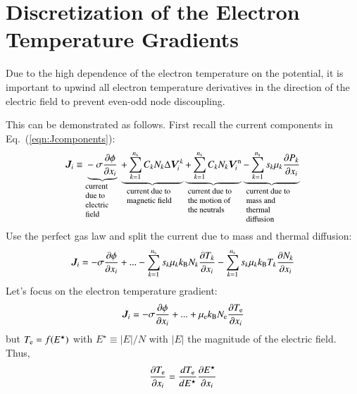 \documentclass{warpdoc}
\newcommand{\ns}{{n_{\rm s}}}
\renewcommand{\vec}[1]{\bm{#1}}
\begin{document}
\section{Discretization of the Electron Temperature Gradients}

 Due to the high dependence of the electron temperature on the potential, it is important to upwind all electron temperature derivatives in the direction of the electric field to prevent even-odd node discoupling. 

This can be demonstrated as follows. First recall the current components in Eq.\ (\ref{eqn:Jcomponents}):
%
\begin{equation}
 \vec{J}_i \equiv 
  \underbrace{-~\sigma\frac{\partial \phi}{\partial x_i}}_{\begin{minipage}{0.1\textwidth}\footnotesize\flushleft current due to electric field \end{minipage}}
\underbrace{+ \sum_{k=1}^\ns C_k N_k \Delta \vec{V}^k_i}_{\begin{minipage}{0.15\textwidth}\footnotesize\flushleft current due to magnetic field \end{minipage}}
\underbrace{+ \sum_{k=1}^\ns C_k N_k \vec{V}^{\rm n}_i}_{\begin{minipage}{0.15\textwidth}\footnotesize\flushleft current due to the motion of the neutrals \end{minipage}}
\underbrace{- \sum_{k=1}^\ns {s_k \mu_k} \frac{\partial P_k}{\partial x_i} }_{\begin{minipage}{0.15\textwidth}\footnotesize\flushleft current due to mass and thermal diffusion \end{minipage}}
\end{equation}
%
Use the perfect gas law and split the current due to mass and thermal diffusion:
%
\begin{equation}
 \vec{J}_i = 
- \sigma\frac{\partial \phi}{\partial x_i}
+ ...
- \sum_{k=1}^\ns s_k \mu_k k_{\rm B} N_k \frac{\partial T_k}{\partial x_i} 
- \sum_{k=1}^\ns s_k \mu_k k_{\rm B} T_k \frac{\partial N_k}{\partial x_i} 
\end{equation}
%
Let's focus on the electron temperature gradient:
%
\begin{equation}
 \vec{J}_i = 
- \sigma\frac{\partial \phi}{\partial x_i}
+ ...
+ \mu_{\rm e} k_{\rm B} N_{\rm e} \frac{\partial T_{\rm e}}{\partial x_i} 
\end{equation}
%
but $T_{\rm e}=f(E^\star)$ with $E^\star\equiv |E|/N$ with $|E|$ the magnitude of the electric field. Thus,
%
\begin{equation}
  \frac{\partial T_{\rm e}}{\partial x_i}=\frac{d T_{\rm e}}{d E^\star}\frac{\partial E^\star}{\partial x_i}
\end{equation}
\end{document}
